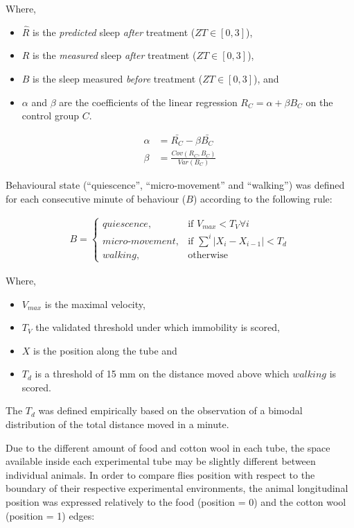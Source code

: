 \documentclass[a4paper,twoside,openright]{article}
\begin{document}
Where,
\begin{itemize}
	\item $\hat{R}$ is the \emph{predicted} sleep \emph{after} treatment ($ZT \in [0, 3]$),
	\item $R$ is the \emph{measured} sleep \emph{after} treatment ($ZT \in [0, 3]$),
	\item $B$ is the sleep measured \emph{before} treatment ($ZT \in [0, 3]$), and
	\item $\alpha$ and $\beta$ are the coefficients of the linear regression $R_C = \alpha + \beta{B_C}$ on the control group $C$.
\end{itemize}

\begin{align}
\alpha &=  \bar{R_C} - \beta\bar{B_C} \\
\beta &= \frac{Cov(R_C, B_C)}{Var(B_C)}
\end{align}


Behavioural state (“quiescence”, “micro-movement” and “walking”) was defined for each consecutive minute of behaviour ($B$) according to the following rule:

\begin{align}
B = 
\begin{cases}
quiescence,            & \text{if } V_{max} < T_V \forall i\\
micro\text{-}movement, & \text{if } \sum^{i}{|X_i - X_{i-1}|} < T_d\\
walking,               & \text{otherwise}
\end{cases}
\end{align}

Where,
\begin{itemize}
	\item $V_{max}$ is the maximal velocity,
	\item $T_V$ the validated threshold under which immobility is scored,
	\item $X$ is the position along the tube and
	\item $T_d$ is a threshold of 15 mm on the distance moved above which $walking$ is scored.
\end{itemize}

The $T_d$ was defined empirically based on the observation of a bimodal distribution of the total distance moved in a minute.

Due to the different amount of food and cotton wool in each tube, the space available inside each experimental tube may be slightly different between individual animals.  
In order to compare flies position with respect to the boundary of their respective experimental environments, the animal longitudinal position was expressed relatively to the food (position = 0) and the cotton wool (position = 1)  edges:
\end{document}
